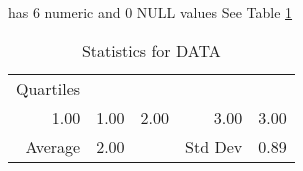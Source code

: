 \item[DATA] has 6 numeric and 0 NULL values
See Table \ref{tab:DATA}
\begin{table}[ht]
\caption{Statistics for DATA} \label{tab:DATA}
\centering
\begin{tabular}{|rrrrr|}
\hline
Quartiles & & & &  \\
1.00 & 1.00 & 2.00 & 3.00 & 3.00 \\
\hline
Average & 2.00 & & Std Dev & 0.89 \\
\hline
\end{tabular}
\end{table}
